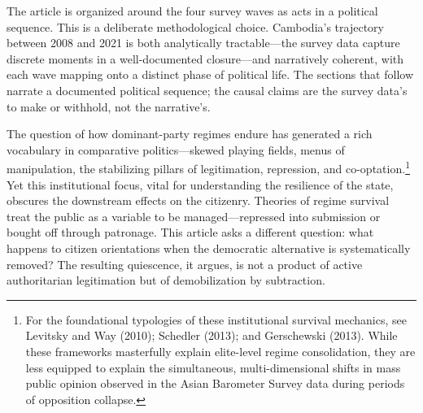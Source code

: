 \documentclass[
  12pt,
  letterpaper]{article}
\begin{document}
The article is organized around the four survey waves as acts in a
political sequence. This is a deliberate methodological choice.
Cambodia's trajectory between 2008 and 2021 is both analytically
tractable---the survey data capture discrete moments in a
well-documented closure---and narratively coherent, with each wave
mapping onto a distinct phase of political life. The sections that
follow narrate a documented political sequence; the causal claims are
the survey data's to make or withhold, not the narrative's.

The question of how dominant-party regimes endure has generated a rich
vocabulary in comparative politics---skewed playing fields, menus of
manipulation, the stabilizing pillars of legitimation, repression, and
co-optation.\footnote{For the foundational typologies of these
  institutional survival mechanics, see Levitsky and Way (2010);
  Schedler (2013); and Gerschewski (2013). While these frameworks
  masterfully explain elite-level regime consolidation, they are less
  equipped to explain the simultaneous, multi-dimensional shifts in mass
  public opinion observed in the Asian Barometer Survey data during
  periods of opposition collapse.} Yet this institutional focus, vital
for understanding the resilience of the state, obscures the downstream
effects on the citizenry. Theories of regime survival treat the public
as a variable to be managed---repressed into submission or bought off
through patronage. This article asks a different question: what happens
to citizen orientations when the democratic alternative is
systematically removed? The resulting quiescence, it argues, is not a
product of active authoritarian legitimation but of demobilization by
subtraction.
\end{document}
